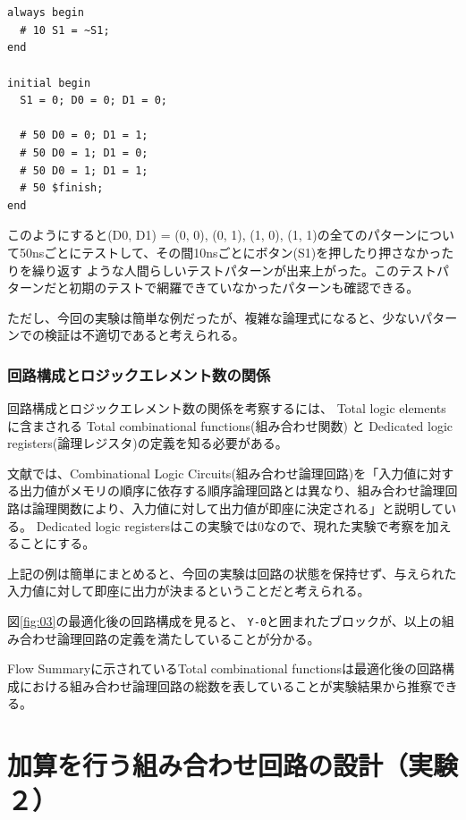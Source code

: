 \documentclass[uplatex]{jsarticle}
\begin{document}
\begin{lstlisting}[basicstyle=\ttfamily\footnotesize, frame=single]


always begin
  # 10 S1 = ~S1;
end

initial begin
  S1 = 0; D0 = 0; D1 = 0;

  # 50 D0 = 0; D1 = 1;
  # 50 D0 = 1; D1 = 0;
  # 50 D0 = 1; D1 = 1;
  # 50 $finish;
end
\end{lstlisting}

このようにすると(D0, D1) = (0, 0), (0, 1), (1, 0), (1, 1)の全てのパターンについて50nsごとにテストして、その間10nsごとにボタン(S1)を押したり押さなかったりを繰り返す
ような人間らしいテストパターンが出来上がった。このテストパターンだと初期のテストで網羅できていなかったパターンも確認できる。

ただし、今回の実験は簡単な例だったが、複雑な論理式になると、少ないパターンでの検証は不適切であると考えられる。

\subsubsection{回路構成とロジックエレメント数の関係}

回路構成とロジックエレメント数の関係を考察するには、 Total logic elements に含まされる Total combinational functions(組み合わせ関数) と Dedicated logic registers(論理レジスタ)の定義を知る必要がある。

文献\cite{et01}では、Combinational Logic Circuits(組み合わせ論理回路)を「入力値に対する出力値がメモリの順序に依存する順序論理回路とは異なり、組み合わせ論理回路は論理関数により、入力値に対して出力値が即座に決定される」と説明している。
Dedicated logic registersはこの実験では0なので、現れた実験で考察を加えることにする。

上記の例は簡単にまとめると、今回の実験は回路の状態を保持せず、与えられた入力値に対して即座に出力が決まるということだと考えられる。

図\ref{fig:03}の最適化後の回路構成を見ると、 {\tt Y-0}と囲まれたブロックが、以上の組み合わせ論理回路の定義を満たしていることが分かる。

Flow Summaryに示されているTotal combinational functionsは最適化後の回路構成における組み合わせ論理回路の総数を表していることが実験結果から推察できる。


\clearpage


\section{加算を行う組み合わせ回路の設計（実験２）}
\end{document}
